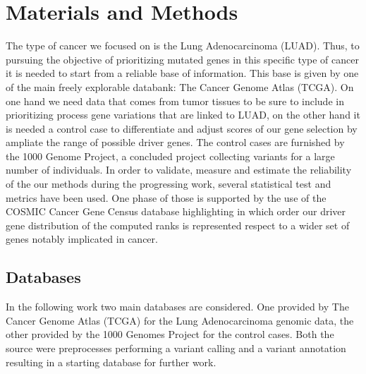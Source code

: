 
\chapter{Materials and Methods} %

\label{Chapter2} %
\overfullrule=2cm

\newcommand{\keyword}[1]{\textbf{#1}}
\newcommand{\tabhead}[1]{\textbf{#1}}
\newcommand{\code}[1]{\texttt{#1}}
\newcommand{\file}[1]{\texttt{\bfseries#1}}
\newcommand{\option}[1]{\texttt{\itshape#1}}


The type of cancer we focused on is the Lung Adenocarcinoma (LUAD). Thus, to pursuing the objective of prioritizing mutated genes in this specific type of cancer it is needed to start from a reliable base of information. This base is given by one of the main freely explorable databank: The Cancer Genome Atlas (TCGA).  On one hand we need data that comes from tumor tissues to be sure to include in prioritizing process gene variations that are linked to LUAD, on the other hand it is needed a control case to differentiate and adjust scores of our gene selection by ampliate the range of possible driver genes. The control cases are furnished by the 1000 Genome Project, a concluded project collecting variants for a large number of individuals. In order to validate, measure and estimate the reliability of the our methods during the progressing work, several statistical test and metrics have been used. One phase of those is supported by the use of the COSMIC Cancer Gene Census database highlighting in which order our driver gene distribution of the computed ranks is represented respect to a wider set of genes notably implicated in cancer.

\section{Databases}
In the following work two main databases are considered. One provided by The Cancer Genome Atlas (TCGA) for the Lung Adenocarcinoma genomic data, the other provided by the 1000 Genomes Project for the control cases. Both the source were preprocesses performing a variant calling and a variant annotation resulting in a starting database for further work.

